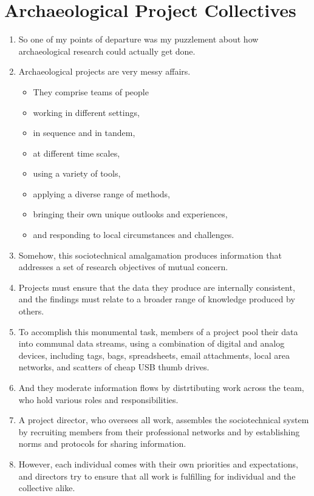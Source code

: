 \documentclass[12pt]{article}
\begin{document}
\section{Archaeological Project Collectives}
\begin{enumerate}
  \item So one of my points of departure was my puzzlement about how archaeological research could actually get done.
  \item Archaeological projects are very messy affairs.
  \begin{itemize}
    \item They comprise teams of people
    \item working in different settings,
    \item in sequence and in tandem,
    \item at different time scales,
    \item using a variety of tools,
    \item applying a diverse range of methods,
    \item bringing their own unique outlooks and experiences,
    \item and responding to local circumstances and challenges.
  \end{itemize}
  \item Somehow, this sociotechnical amalgamation produces information that addresses a set of research objectives of mutual concern.
  \item Projects must ensure that the data they produce are internally consistent, and the findings must relate to a broader range of knowledge produced by others.
  \item To accomplish this monumental task, members of a project pool their data into communal data streams, using a combination of digital and analog devices, including tags, bags, spreadsheets, email attachments, local area networks, and scatters of cheap USB thumb drives.
  \item And they moderate information flows by distrtibuting work across the team, who hold various roles and responsibilities.
  \item A project director, who oversees all work, assembles the sociotechnical system by recruiting members from their professional networks and by establishing norms and protocols for sharing information.
  \item However, each individual comes with their own priorities and expectations, and directors try to ensure that all work is fulfilling for individual and the collective alike.
\end{enumerate}
\end{document}
